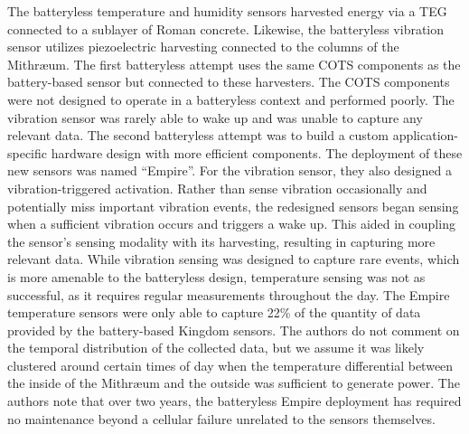 The batteryless temperature and humidity sensors harvested energy via a TEG connected to a sublayer of Roman concrete. 
Likewise, the batteryless vibration sensor utilizes piezoelectric harvesting connected to the columns of the Mithræum. 
The first batteryless attempt uses the same COTS components as the battery-based sensor but connected to these harvesters. 
The COTS components were not designed to operate in a batteryless context and performed poorly.
The vibration sensor was rarely able to wake up and was unable to capture any relevant data. 
The second batteryless attempt was to build a custom application-specific hardware design with more efficient
components. The deployment of these new sensors was named ``Empire''.
For the vibration sensor, they also designed a vibration-triggered activation.
Rather than sense vibration occasionally and potentially miss important vibration events, the redesigned sensors began sensing when a sufficient vibration occurs and triggers a wake up. 
This aided in coupling the sensor's sensing modality with its harvesting, resulting in capturing more relevant data.
While vibration sensing was designed to capture rare events, which is more amenable to the batteryless design, temperature sensing was not as successful, as it requires regular measurements throughout the day. The Empire temperature sensors were only able to capture 22\% of the quantity of data provided by the battery-based Kingdom sensors.
The authors do not comment on the temporal distribution of the collected data, but we assume it was likely clustered around certain times of day when the temperature differential between the inside of the Mithræum and the outside was sufficient to generate power.
The authors note that over two years, the batteryless Empire deployment has required no maintenance beyond a cellular failure unrelated to the sensors themselves. 

